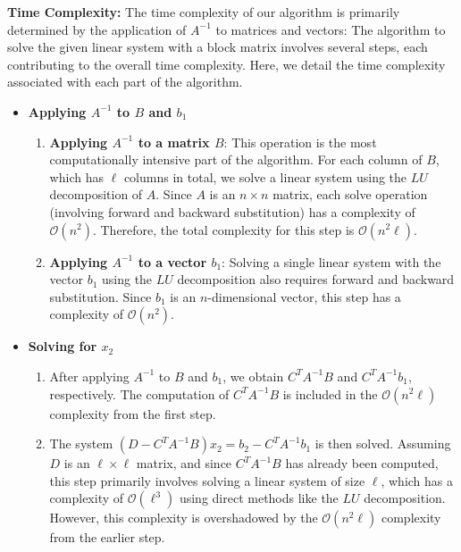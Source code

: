 \documentclass[11pt,onecolumn]{article}
\begin{document}
\begin{enumerate}[label=(\alph*)]
          \textbf{Time Complexity:}
          The time complexity of our algorithm is primarily determined by the application of \(A^{-1}\) to matrices and vectors:
          The algorithm to solve the given linear system with a block matrix involves several steps, each contributing to the overall time complexity. Here, we detail the time complexity associated with each part of the algorithm.

          \begin{itemize}
              \item \textbf{Applying \(A^{-1}\) to \(B\) and \(b_1\)}

                    \begin{enumerate}
                        \item \textbf{Applying \(A^{-1}\) to a matrix \(B\)}: This operation is the most computationally intensive part of the algorithm. For each column of \(B\), which has \(\ell\) columns in total, we solve a linear system using the \(LU\) decomposition of \(A\). Since \(A\) is an \(n \times n\) matrix, each solve operation (involving forward and backward substitution) has a complexity of \(\mathcal{O}(n^2)\). Therefore, the total complexity for this step is \(\mathcal{O}(n^2\ell)\).

                        \item \textbf{Applying \(A^{-1}\) to a vector \(b_1\)}: Solving a single linear system with the vector \(b_1\) using the \(LU\) decomposition also requires forward and backward substitution. Since \(b_1\) is an \(n\)-dimensional vector, this step has a complexity of \(\mathcal{O}(n^2)\).
                    \end{enumerate}

              \item \textbf{Solving for \(x_2\)}

                    \begin{enumerate}
                        \item After applying \(A^{-1}\) to \(B\) and \(b_1\), we obtain \(C^TA^{-1}B\) and \(C^TA^{-1}b_1\), respectively. The computation of \(C^TA^{-1}B\) is included in the \(\mathcal{O}(n^2\ell)\) complexity from the first step.

                        \item The system \((D - C^TA^{-1}B)x_2 = b_2 - C^TA^{-1}b_1\) is then solved. Assuming \(D\) is an \(\ell \times \ell\) matrix, and since \(C^TA^{-1}B\) has already been computed, this step primarily involves solving a linear system of size \(\ell\), which has a complexity of \(\mathcal{O}(\ell^3)\) using direct methods like the \(LU\) decomposition. However, this complexity is overshadowed by the \(\mathcal{O}(n^2\ell)\) complexity from the earlier step.
                    \end{enumerate}


\end{itemize}
\end{enumerate}
\end{document}
